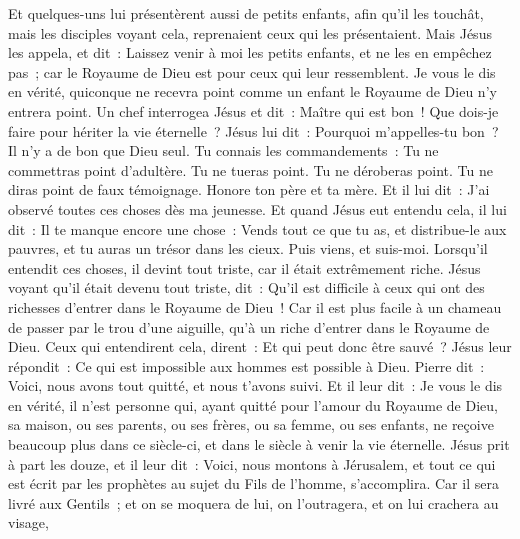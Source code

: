 \begin{multicols}{2}
Et quelques-uns lui présentèrent aussi de petits enfants, afin qu'il les touchât, mais les disciples voyant cela, reprenaient ceux qui les présentaient.
Mais Jésus les appela, et dit~: Laissez venir à moi les petits enfants, et ne les en empêchez pas~; car le Royaume de Dieu est pour ceux qui leur ressemblent.
Je vous le dis en vérité, quiconque ne recevra point comme un enfant le Royaume de Dieu n'y entrera point.
Un chef interrogea Jésus et dit~: Maître qui est bon~! Que dois-je faire pour hériter la vie éternelle~?
Jésus lui dit~: Pourquoi m'appelles-tu bon~? Il n'y a de bon que Dieu seul.
Tu connais les commandements~: Tu ne commettras point d'adultère. Tu ne tueras point. Tu ne déroberas point. Tu ne diras point de faux témoignage. Honore ton père et ta mère.
Et il lui dit~: J'ai observé toutes ces choses dès ma jeunesse.
Et quand Jésus eut entendu cela, il lui dit~: Il te manque encore une chose~: Vends tout ce que tu as, et distribue-le aux pauvres, et tu auras un trésor dans les cieux. Puis viens, et suis-moi.
Lorsqu'il entendit ces choses, il devint tout triste, car il était extrêmement riche.
Jésus voyant qu'il était devenu tout triste, dit~: Qu'il est difficile à ceux qui ont des richesses d'entrer dans le Royaume de Dieu~!
Car il est plus facile à un chameau de passer par le trou d'une aiguille, qu'à un riche d'entrer dans le Royaume de Dieu.
Ceux qui entendirent cela, dirent~: Et qui peut donc être sauvé~?
Jésus leur répondit~: Ce qui est impossible aux hommes est possible à Dieu.
Pierre dit~: Voici, nous avons tout quitté, et nous t'avons suivi.
Et il leur dit~: Je vous le dis en vérité, il n'est personne qui, ayant quitté pour l'amour du Royaume de Dieu, sa maison, ou ses parents, ou ses frères, ou sa femme, ou ses enfants,
ne reçoive beaucoup plus dans ce siècle-ci, et dans le siècle à venir la vie éternelle.
Jésus prit à part les douze, et il leur dit~: Voici, nous montons à Jérusalem, et tout ce qui est écrit par les prophètes au sujet du Fils de l'homme, s'accomplira.
Car il sera livré aux Gentils~; et on se moquera de lui, on l'outragera, et on lui crachera au visage,

\end{multicols}
